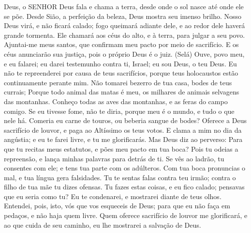 {\PP 
  Deus, o SENHOR Deus fala e chama a terra, desde onde o sol nasce até onde ele se põe.
  Desde Sião, a perfeição da beleza, Deus mostra seu imenso brilho.
  Nosso Deus virá, e não ficará calado; fogo queimará adiante dele, e ao redor dele haverá grande tormenta.
  Ele chamará aos céus do alto, e à terra, para julgar a seu povo.
  Ajuntai-me meus santos, que confirmam meu pacto por meio de sacrifício.
  E os céus anunciarão sua justiça, pois o próprio Deus é o juiz. (Selá)
  Ouve, povo meu, e eu falarei; eu darei testemunho contra ti, Israel; eu sou Deus, o teu Deus.
  Eu não te repreenderei por causa de teus sacrifícios, porque teus holocaustos estão continuamente perante mim.
  Não tomarei bezerro de tua casa,
{} bodes de teus currais;
  Porque todo animal das matas é meu,
{} os milhares de animais selvagens das montanhas.
  Conheço todas as aves das montanhas, e as feras do campo
{} comigo.
  Se eu tivesse fome, não te diria, porque meu é o mundo, e tudo o que nele há.
  Comeria eu carne de touros, ou beberia sangue de bodes?
  Oferece a Deus sacrifício de louvor, e paga ao Altíssimo os teus votos.
  E clama a mim no dia da angústia; e eu te farei livre, e tu me glorificarás.
  Mas Deus diz ao perverso: Para que tu recitas meus estatutos, e pões meu pacto em tua boca?
  Pois tu odeias a repreensão, e lança minhas palavras para detrás de ti.
  Se vês ao ladrão, tu consentes com ele; e tens tua parte com os adúlteros.
  Com tua boca pronuncias o mal, e tua língua gera falsidades.
  Tu te sentas
{} falas contra teu irmão; contra o filho de tua mãe tu dizes ofensas.
  Tu fazes estas coisas, e eu fico calado; pensavas que eu seria como tu? Eu te condenarei, e mostrarei
{} diante de teus olhos.
  Entendei, pois, isto, vós que vos esqueceis de Deus; para que eu não
{} faça em pedaços, e não haja quem
{} livre.
  Quem oferece sacrifício de louvor me glorificará, e ao que cuida de seu caminho, eu lhe mostrarei a salvação de Deus.
\par }


